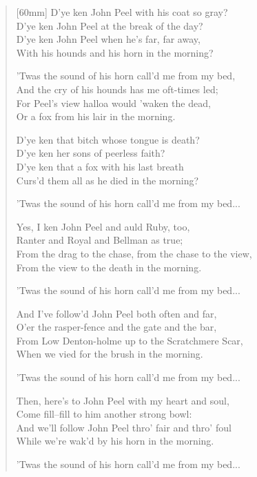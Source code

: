 \begin{verse}[60mm]
\footnotesize
D'ye ken John Peel with his coat so gray? \\
D'ye ken John Peel at the break of the day? \\
D'ye ken John Peel when he's far, far away, \\
With his hounds and his horn in the morning?

\vin  'Twas the sound of his horn call'd me from my bed, \\
\vin  And the cry of his hounds has me oft-times led; \\
\vin  For Peel's view halloa would 'waken the dead, \\
\vin  Or a fox from his lair in the morning.

D'ye ken that bitch whose tongue is death? \\
D'ye ken her sons of peerless faith? \\
D'ye ken that a fox with his last breath \\
Curs'd them all as he died in the morning?

\vin  'Twas the sound of his horn call'd me from my bed...

Yes, I ken John Peel and auld Ruby, too, \\
Ranter and Royal and Bellman as true; \\
From the drag to the chase, from the chase to the view, \\
From the view to the death in the morning.

\vin  'Twas the sound of his horn call'd me from my bed...

And I've follow'd John Peel both often and far, \\
O'er the rasper-fence and the gate and the bar, \\
From Low Denton-holme up to the Scratchmere Scar, \\
When we vied for the brush in the morning.

\vin  'Twas the sound of his horn call'd me from my bed...

Then, here's to John Peel with my heart and soul, \\
Come fill--fill to him another strong bowl: \\
And we'll follow John Peel thro' fair and thro' foul \\
While we're wak'd by his horn in the morning.

\vin  'Twas the sound of his horn call'd me from my bed...
\end{verse}

